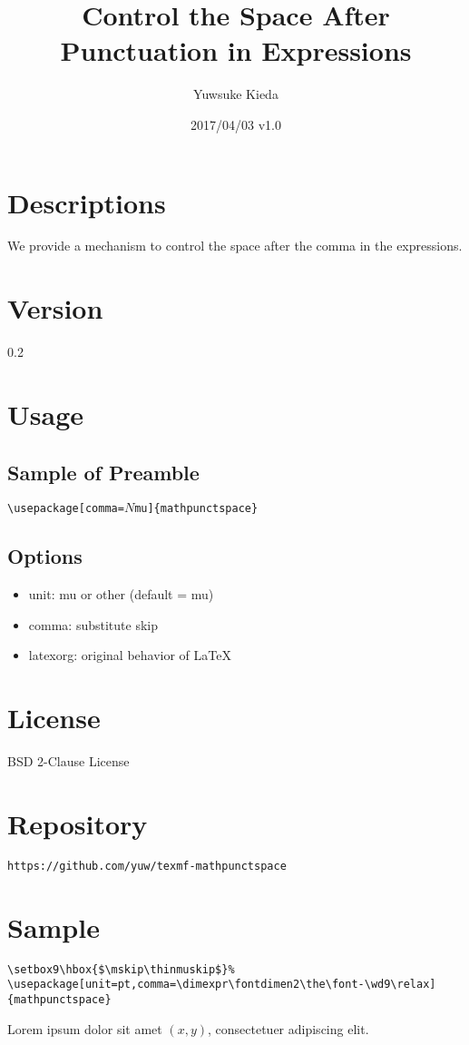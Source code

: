 \documentclass{article}
\title{Control the Space After Punctuation in Expressions}
\author{Yuwsuke Kieda}
\date{2017/04/03 v1.0}
\begin{document}
\maketitle

\section{Descriptions}

We provide a mechanism to control the space after the comma in the expressions.

\section{Version}

0.2

\section{Usage}

\subsection{Sample of Preamble}

\noindent
\verb!\!\texttt{usepackage[comma=$N$mu]}\verb!{mathpunctspace}!

\subsection{Options}

\begin{itemize}
 \item unit: mu or other (default = mu)
 \item comma: substitute skip
 \item latexorg: original behavior of LaTeX
\end{itemize}

\section{License}

BSD 2-Clause License

\section{Repository}

\texttt{https://github.com/yuw/texmf-mathpunctspace}

\section{Sample}

\begin{verbatim}
\setbox9\hbox{$\mskip\thinmuskip$}%
\usepackage[unit=pt,comma=\dimexpr\fontdimen2\the\font-\wd9\relax]{mathpunctspace}
\end{verbatim}

Lorem ipsum dolor sit amet $(x, y)$, consectetuer adipiscing elit.
\end{document}
